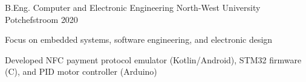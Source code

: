 \begin{cventries}

  \cventry
  {B.Eng. Computer and Electronic Engineering}
  {North-West University}
  {Potchefstroom}
  {2020}
  {
    \begin{cvitems}
      \item Focus on embedded systems, software engineering, and electronic design
      \item Developed NFC payment protocol emulator (Kotlin/Android), STM32 firmware (C), and PID motor controller (Arduino)
    \end{cvitems}
  }

\end{cventries}
